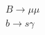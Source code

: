 \documentclass[preprint,3p,12pt]{elsarticle}
\begin{document}
\textbf{$B\to \mu\mu$}\\

\textbf{$b\to s \gamma$}\\
\end{document}
